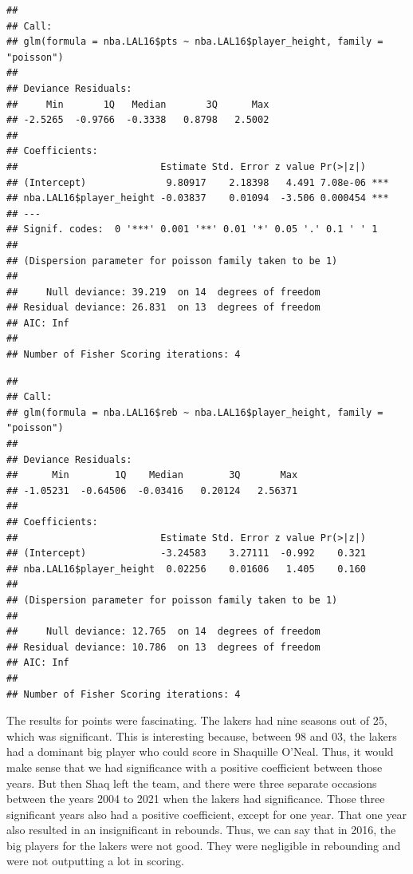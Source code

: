 \documentclass[11pt,letterpaper]{amsart}
\begin{document}
\begin{verbatim}
## 
## Call:
## glm(formula = nba.LAL16$pts ~ nba.LAL16$player_height, family = "poisson")
## 
## Deviance Residuals: 
##     Min       1Q   Median       3Q      Max  
## -2.5265  -0.9766  -0.3338   0.8798   2.5002  
## 
## Coefficients:
##                         Estimate Std. Error z value Pr(>|z|)    
## (Intercept)              9.80917    2.18398   4.491 7.08e-06 ***
## nba.LAL16$player_height -0.03837    0.01094  -3.506 0.000454 ***
## ---
## Signif. codes:  0 '***' 0.001 '**' 0.01 '*' 0.05 '.' 0.1 ' ' 1
## 
## (Dispersion parameter for poisson family taken to be 1)
## 
##     Null deviance: 39.219  on 14  degrees of freedom
## Residual deviance: 26.831  on 13  degrees of freedom
## AIC: Inf
## 
## Number of Fisher Scoring iterations: 4
\end{verbatim}


\begin{verbatim}
## 
## Call:
## glm(formula = nba.LAL16$reb ~ nba.LAL16$player_height, family = "poisson")
## 
## Deviance Residuals: 
##      Min        1Q    Median        3Q       Max  
## -1.05231  -0.64506  -0.03416   0.20124   2.56371  
## 
## Coefficients:
##                         Estimate Std. Error z value Pr(>|z|)
## (Intercept)             -3.24583    3.27111  -0.992    0.321
## nba.LAL16$player_height  0.02256    0.01606   1.405    0.160
## 
## (Dispersion parameter for poisson family taken to be 1)
## 
##     Null deviance: 12.765  on 14  degrees of freedom
## Residual deviance: 10.786  on 13  degrees of freedom
## AIC: Inf
## 
## Number of Fisher Scoring iterations: 4
\end{verbatim}

The results for points were fascinating. The lakers had nine seasons out of 25, which was significant. This is interesting because, between 98 and 03, the lakers had a dominant big player who could score in Shaquille O’Neal. Thus, it would make sense that we had significance with a positive coefficient between those years. But then Shaq left the team, and there were three separate occasions between the years 2004 to 2021 when the lakers had significance. Those three significant years also had a positive coefficient, except for one year. That one year also resulted in an insignificant in rebounds. Thus, we can say that in 2016, the big players for the lakers were not good. They were negligible in rebounding and were not outputting a lot in scoring.\\
\end{document}
